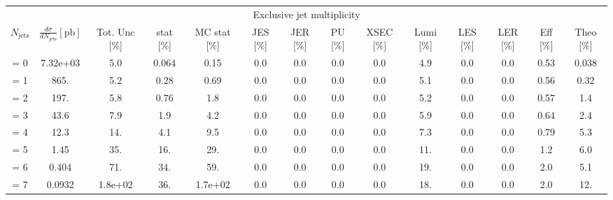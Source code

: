 \documentclass{article}
\begin{document}
\begin{table}[htb!]
\begin{center}
\begin{adjustwidth}{-3cm}{}
\begin{tabular}{c|cc|ccccccccccc}
\multicolumn{14}{c}{Exclusive jet multiplicity} \\
$N_{\text{jets}}$ & $\frac{d\sigma}{dN_{\text{jets}}} \left[\text{pb}\right]$ & \tiny{Tot. Unc [\%]} & \tiny{stat [\%]} & \tiny{MC stat [\%]} & \tiny{JES [\%]} & \tiny{JER [\%]} & \tiny{PU [\%]} & \tiny{XSEC [\%]} & \tiny{Lumi [\%]} & \tiny{LES [\%]} & \tiny{LER [\%]} &  \tiny{Eff [\%]} & \tiny{Theo [\%]} \\\hline
= 0 & 7.32e+03 & 5.0 & 0.064 & 0.15 & 0.0 & 0.0 & 0.0 & 0.0 & 4.9 & 0.0 & 0.0 & 0.53 &
0.038 \\
= 1 & 865. & 5.2 & 0.28 & 0.69 & 0.0 & 0.0 & 0.0 & 0.0 & 5.1 & 0.0 & 0.0 & 0.56 &
0.32  \\
= 2 & 197. & 5.8 & 0.76 & 1.8 & 0.0 & 0.0 & 0.0 & 0.0 & 5.2 & 0.0 & 0.0 & 0.57 &
1.4 \\
= 3 & 43.6 & 7.9 & 1.9 & 4.2 & 0.0 & 0.0 & 0.0 & 0.0 & 5.9 & 0.0 & 0.0 & 0.64 &
2.4 \\
= 4 & 12.3 & 14. & 4.1 & 9.5 & 0.0 & 0.0 & 0.0 & 0.0 & 7.3 & 0.0 & 0.0 & 0.79 &
5.3 \\
= 5 & 1.45 & 35. & 16. & 29. & 0.0 & 0.0 & 0.0 & 0.0 & 11. & 0.0 & 0.0 & 1.2 &
6.0 \\
= 6 & 0.404 & 71. & 34. & 59. & 0.0 & 0.0 & 0.0 & 0.0 & 19. & 0.0 & 0.0 & 2.0 &
5.1  \\
= 7 & 0.0932 & 1.8e+02 & 36. & 1.7e+02 & 0.0 & 0.0 & 0.0 & 0.0 & 18. & 0.0 & 0.0 & 2.0 & 12. \\
\end{tabular}
\label{tab:SMuZNGoodJets_Zexc}
\end{adjustwidth}
\end{center}
\end{table}
\end{document}

